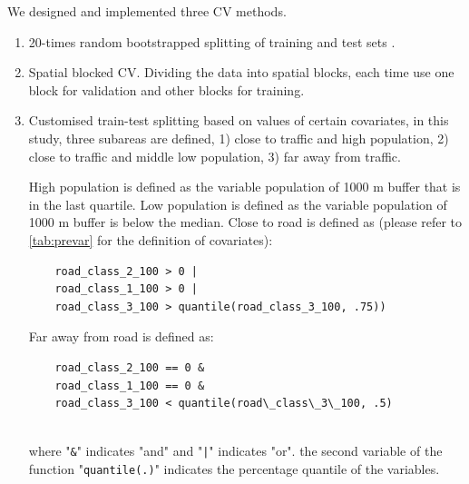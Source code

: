 \documentclass{article}
\begin{document}
We designed and implemented three CV methods. 
\begin{enumerate}
\item  20-times random bootstrapped splitting of training and test sets \citep{luglobal}.  


\item Spatial blocked CV. Dividing the data into spatial blocks, each time use one block for validation and other blocks for training. 
    
\item Customised train-test splitting based on values of certain covariates, in this study, three subareas are defined,  1) close to traffic and high population,  
    2) close to traffic and middle low population, 3) far away from traffic. 
    
    High population is defined as the variable population of 1000 m buffer that is in the last quartile. Low population is defined as the variable population of 1000 m buffer is below the median. Close to road is defined as (please refer to \cref{tab:prevar} for the definition of covariates): 
    \begin{lstlisting} 
    road_class_2_100 > 0 | 
    road_class_1_100 > 0 |
    road_class_3_100 > quantile(road_class_3_100, .75)) \end{lstlisting}
   
    Far away from road is defined as:
  \begin{lstlisting} 
    road_class_2_100 == 0 &
    road_class_1_100 == 0 & 
    road_class_3_100 < quantile(road\_class\_3\_100, .5)
    
    \end{lstlisting}
    where "{\tt \&}" indicates "and" and "{\tt |}" indicates "or". the second variable of the function "{\tt quantile(.)}" indicates the percentage quantile of the variables. 
   
\end{enumerate}
\end{document}
